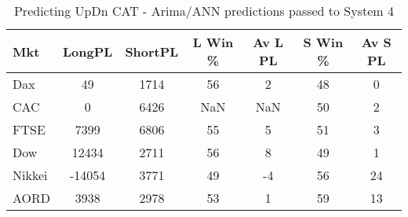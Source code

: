 \begin{table}[ht]
\centering
\caption[Predicting UpDn CAT - Arima/ANN predictions passed to System 4.]{Predicting UpDn CAT - Arima/ANN predictions passed to System 4} 
\label{tab:chp_ts:pUD_CAT_arima_ann_sys}
\begin{tabular}{lcccccc}
  \toprule Mkt & LongPL & ShortPL & L Win \% & Av L PL & S Win \% & Av S PL \\ 
  \midrule Dax & 49 & 1714 & 56 & 2 & 48 & 0 \\ 
  CAC & 0 & 6426 & NaN & NaN & 50 & 2 \\ 
  FTSE & 7399 & 6806 & 55 & 5 & 51 & 3 \\ 
  Dow & 12434 & 2711 & 56 & 8 & 49 & 1 \\ 
  Nikkei & -14054 & 3771 & 49 & -4 & 56 & 24 \\ 
  AORD & 3938 & 2978 & 53 & 1 & 59 & 13 \\ 
   \bottomrule \end{tabular}
\end{table}
